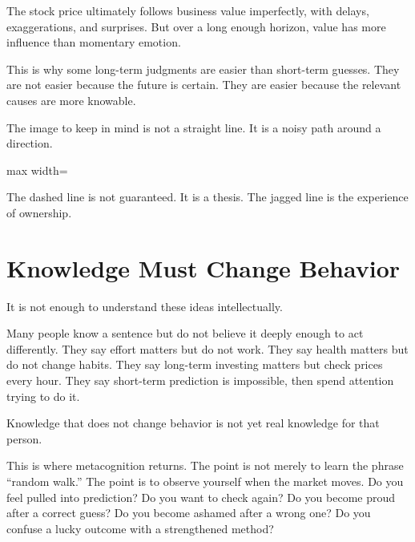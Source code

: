 The stock price ultimately follows business value imperfectly, with delays, exaggerations, and surprises. But over a long enough horizon, value has more influence than momentary emotion.

This is why some long-term judgments are easier than short-term guesses. They are not easier because the future is certain. They are easier because the relevant causes are more knowable.

The image to keep in mind is not a straight line. It is a noisy path around a direction.

\begin{center}
\begin{adjustbox}{max width=\linewidth}
\end{adjustbox}
\end{center}

The dashed line is not guaranteed. It is a thesis. The jagged line is the experience of ownership.

\section*{Knowledge Must Change Behavior}

It is not enough to understand these ideas intellectually.

Many people know a sentence but do not believe it deeply enough to act differently. They say effort matters but do not work. They say health matters but do not change habits. They say long-term investing matters but check prices every hour. They say short-term prediction is impossible, then spend attention trying to do it.

Knowledge that does not change behavior is not yet real knowledge for that person.

This is where metacognition returns. The point is not merely to learn the phrase ``random walk.'' The point is to observe yourself when the market moves. Do you feel pulled into prediction? Do you want to check again? Do you become proud after a correct guess? Do you become ashamed after a wrong one? Do you confuse a lucky outcome with a strengthened method?

